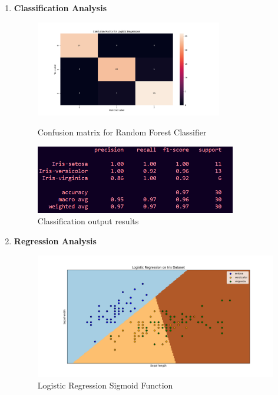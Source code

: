 \documentclass[a4paper]{article}
\begin{document}
\begin{enumerate}
	\item \textbf{Classification Analysis}
\begin{figure}[h]
	\begin{minipage}{0.32\textwidth}
		\centering
		\includegraphics[height=4.2cm]{picture/LR2} %
		\caption{Confusion matrix for Random Forest Classifier}
		\label{fig:setosa}
	\end{minipage}\hspace{3cm}
	\begin{minipage}{0.32\textwidth}
		\centering
		\includegraphics[height=3cm]{picture/LR3} %
		\caption{Classification output results}
		\label{fig:versicolour}
	\end{minipage}\hfill
\end{figure}
	\item \textbf{Regression Analysis}
	\begin{figure}[h]
		\centering
		\includegraphics[width=1\textwidth]{picture/LR4}
		\caption{Logistic Regression Sigmoid Function}
		\label{fig:logistic_regression}
	\end{figure}
\end{enumerate}
\end{document}
